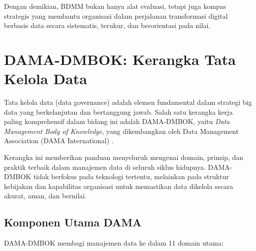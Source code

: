 Dengan demikian, BDMM bukan hanya alat evaluasi, tetapi juga kompas strategis yang membantu organisasi dalam perjalanan transformasi digital berbasis data secara sistematis, terukur, dan berorientasi pada nilai.



\section{DAMA-DMBOK: Kerangka Tata Kelola Data}

Tata kelola data (data governance) adalah elemen fundamental dalam strategi big data yang berkelanjutan dan bertanggung jawab. Salah satu kerangka kerja paling komprehensif dalam bidang ini adalah DAMA-DMBOK, yaitu \textit{Data Management Body of Knowledge}, yang dikembangkan oleh Data Management Association (DAMA International) \cite{dama2017}.

Kerangka ini memberikan panduan menyeluruh mengenai domain, prinsip, dan praktik terbaik dalam manajemen data di seluruh siklus hidupnya. DAMA-DMBOK tidak berfokus pada teknologi tertentu, melainkan pada struktur kebijakan dan kapabilitas organisasi untuk memastikan data dikelola secara akurat, aman, dan bernilai.

\subsection{Komponen Utama DAMA}

DAMA-DMBOK membagi manajemen data ke dalam 11 domain utama:

